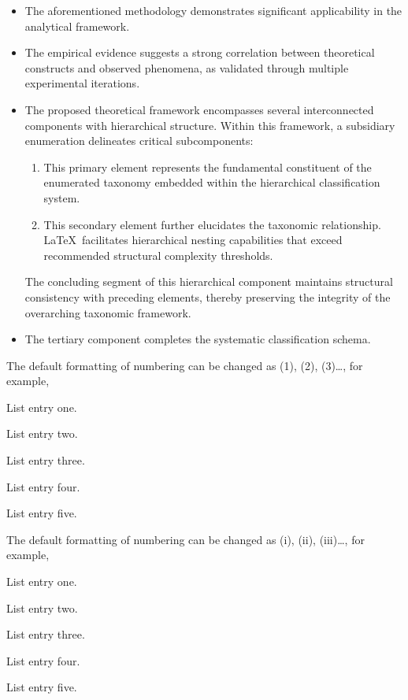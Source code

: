 \documentclass{aer}      %
\begin{document}
\begin{itemize}
  \item The aforementioned methodology demonstrates significant applicability in the analytical framework.
\item The empirical evidence suggests a strong correlation between theoretical constructs and observed phenomena, as validated through multiple experimental iterations.
\item The proposed theoretical framework encompasses several interconnected components with hierarchical structure. Within this framework, a subsidiary enumeration delineates critical subcomponents:
         \begin{enumerate}
            \item This primary element represents the fundamental constituent of the enumerated taxonomy embedded within the hierarchical classification system.

            \item This secondary element further elucidates the taxonomic relationship.  
                  \LaTeX\ facilitates hierarchical nesting capabilities that exceed recommended structural complexity thresholds.
         \end{enumerate}
         The concluding segment of this hierarchical component maintains structural consistency with preceding elements, thereby preserving the integrity of the overarching taxonomic framework.
   \item The tertiary component completes the systematic classification schema.
\end{itemize}
\pagebreak

The default formatting of numbering can be changed as (1), (2), (3)\ldots, for example, 
\begin{arabiclist}
\item List entry one.
\item List entry two.
\item List entry three.
\item List entry four.
\item List entry five.
\end{arabiclist}


The default formatting of numbering can be changed as (i), (ii), (iii)\ldots, for example, 
\begin{romanlist}
\item List entry one.
\item List entry two.
\item List entry three.
\item List entry four.
\item List entry five.
\end{romanlist}
\end{document}

